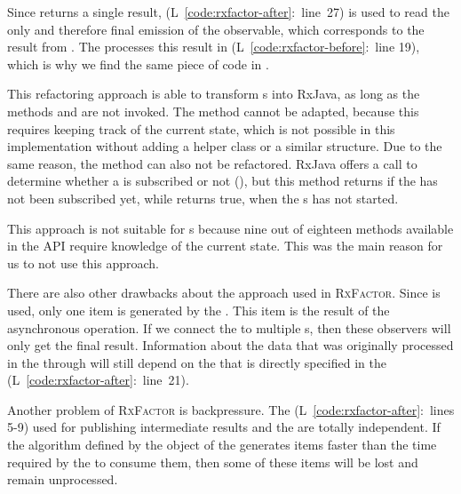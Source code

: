 \documentclass[type=bsc,accentcolor=tud9c]{tudthesis}
\newcommand{\framework}[1]{\textcolor{black!65}{#1}}
\begin{document}
Since  returns a single result,  (L~\ref{code:rxfactor-after}:~line~27) is used to read the only and therefore final emission of the observable, which corresponds to the result from . The  processes this result in  (L~\ref{code:rxfactor-before}:~line 19), which is why we find the same piece of code in .




This refactoring approach is able to transform s into \framework{RxJava}, as long as the methods  and  are not invoked. The method  cannot be adapted, because this requires keeping track of the current state, which is not possible in this implementation without adding a helper class or a similar structure. Due to the same reason, the method  can also not be refactored. \framework{RxJava} offers a call to determine whether a  is subscribed or not (), but this method returns  if the  has not been subscribed yet, while  returns true, when the s has not started. 

This approach is not suitable for s because nine out of eighteen methods available in the  API require knowledge of the current state. This was the main reason for us to not use this approach.

There are also other drawbacks about the approach used in \textsc{RxFactor}. Since  is used, only one item is generated by the . This item is the result of the asynchronous operation. If we connect the  to multiple s, then these observers will only get the final result. Information about the data that was originally processed in the  through  will still depend on the  that is directly specified in the  (L~\ref{code:rxfactor-after}:~line~21).

Another problem of \textsc{RxFactor} is backpressure. The  (L~\ref{code:rxfactor-after}:~lines 5-9) used for publishing intermediate results and the  are totally independent. If the algorithm defined by the  object of the  generates items faster than the time required by the  to consume them, then some of these items will be lost and remain unprocessed.
\end{document}
